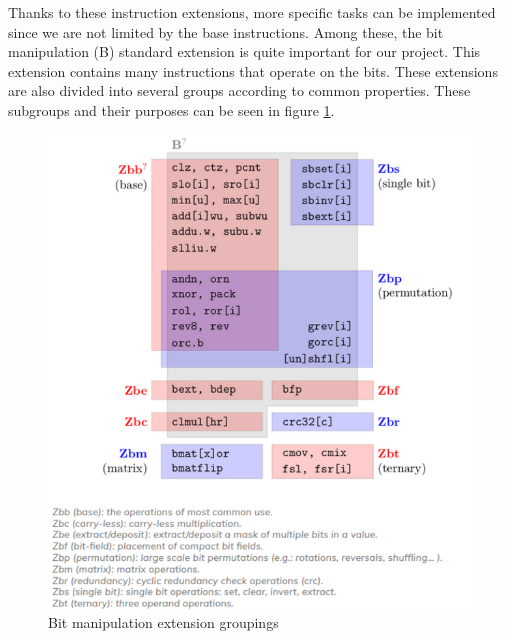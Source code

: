 Thanks to these instruction extensions, more specific tasks can be implemented since we are not limited by the base instructions.
Among these, the bit manipulation (B) standard extension is quite important for our project. This extension contains many instructions that operate on the bits. These extensions are also divided into several groups according to common properties. These subgroups and their purposes can be seen in figure \ref{fig:bit_manipulation_extension_groupings}.
\begin{figure}
    \centering
    \includegraphics{riscv/bit_manipulation_extension_groupings.png}
    \caption{Bit manipulation extension groupings \cite{bitmanipgroups}}
    \label{fig:bit_manipulation_extension_groupings}
\end{figure}

